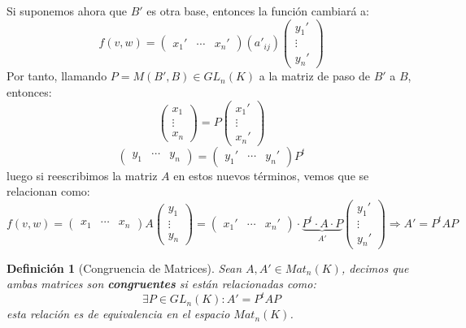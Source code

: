 \documentclass[10pt,a4paper,openright]{book}
\theoremstyle{break}
\newtheorem*{defi}{Definición}
\begin{document}
Si suponemos ahora que $B'$ es otra base, entonces la función cambiará a:
$$f(v,w)=\begin{pmatrix} x_1' & \cdots & x_n'\end{pmatrix}(a'_{ij})\begin{pmatrix} y_1' \\ \vdots \\ y_n' \end{pmatrix} $$
Por tanto, llamando $P=M(B',B)\in GL_n(K)$ a la matriz de paso de $B'$ a $B$, entonces:
$$\begin{pmatrix} x_1 \\ \vdots \\ x_n\end{pmatrix}=P\begin{pmatrix} x_1' \\ \vdots \\ x_n' \end{pmatrix} $$
$$\begin{pmatrix} y_1 & \cdots & y_n\end{pmatrix}=\begin{pmatrix} y_1' & \cdots & y_n' \end{pmatrix} P^t$$
luego si reescribimos la matriz $A$ en estos nuevos términos, vemos que se relacionan como:
$$f(v,w)=\begin{pmatrix} x_1 & \cdots & x_n\end{pmatrix} A \begin{pmatrix} y_1 \\ \vdots \\ y_n \end{pmatrix} = \begin{pmatrix} x_1' & \cdots & x_n'\end{pmatrix}\cdot \underbrace{P^t \cdot A \cdot P}_{A'} \begin{pmatrix} y_1' \\ \vdots \\ y_n' \end{pmatrix} \Rightarrow A'=P^tAP$$
\begin{defi}[Congruencia de Matrices]
Sean $A, A'\in Mat_n(K)$, decimos que ambas matrices son \textbf{congruentes} si están relacionadas como:
$$\exists P \in GL_n(K) : A' = P^tAP$$
esta relación es de equivalencia en el espacio $Mat_n(K)$.
\end{defi}
\end{document}
